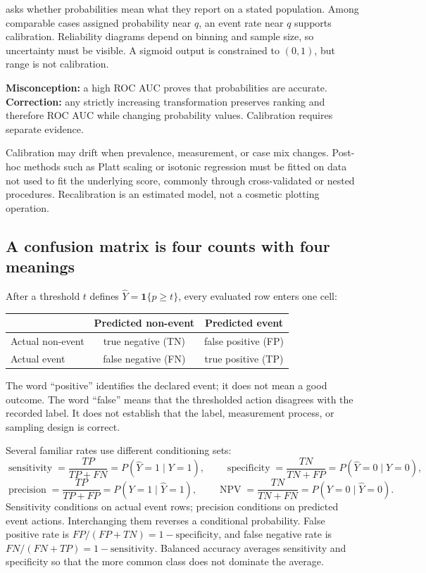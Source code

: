  asks whether probabilities mean what they report on a stated
population. Among comparable cases assigned probability near $q$, an event rate
near $q$ supports calibration. Reliability diagrams depend on binning and sample
size, so uncertainty must be visible. A sigmoid output is constrained to
$(0,1)$, but range is not calibration.

\begin{misconceptionbox}
\textbf{Misconception:} a high ROC AUC proves that probabilities are accurate.
\textbf{Correction:} any strictly increasing transformation preserves ranking
and therefore ROC AUC while changing probability values. Calibration requires
separate evidence.
\end{misconceptionbox}

Calibration may drift when prevalence, measurement, or case mix changes.
Post-hoc methods such as Platt scaling or isotonic regression must be fitted on
data not used to fit the underlying score, commonly through cross-validated or
nested procedures. Recalibration is an estimated model, not a cosmetic plotting
operation.

\subsection{A confusion matrix is four counts with four meanings}

After a threshold $t$ defines
$\widehat Y=\mathbf{1}\{p\ge t\}$, every evaluated row enters one cell:

\begin{center}
\begin{tabular}{@{}lcc@{}}
\toprule
& Predicted non-event & Predicted event \\
\midrule
Actual non-event & true negative (TN) & false positive (FP) \\
Actual event & false negative (FN) & true positive (TP) \\
\bottomrule
\end{tabular}
\end{center}

The word ``positive'' identifies the declared event; it does not mean a good
outcome. The word ``false'' means that the thresholded action disagrees with the
recorded label. It does not establish that the label, measurement process, or
sampling design is correct.

Several familiar rates use different conditioning sets:
\[
\operatorname{sensitivity}
=\frac{TP}{TP+FN}=P(\widehat Y=1\mid Y=1),
\qquad
\operatorname{specificity}
=\frac{TN}{TN+FP}=P(\widehat Y=0\mid Y=0),
\]
\[
\operatorname{precision}
=\frac{TP}{TP+FP}=P(Y=1\mid\widehat Y=1),
\qquad
\operatorname{NPV}
=\frac{TN}{TN+FN}=P(Y=0\mid\widehat Y=0).
\]
Sensitivity conditions on actual event rows; precision conditions on predicted
event actions. Interchanging them reverses a conditional probability. False
positive rate is $FP/(FP+TN)=1-\text{specificity}$, and false negative rate is
$FN/(FN+TP)=1-\text{sensitivity}$. Balanced accuracy averages sensitivity and
specificity so that the more common class does not dominate the average.

